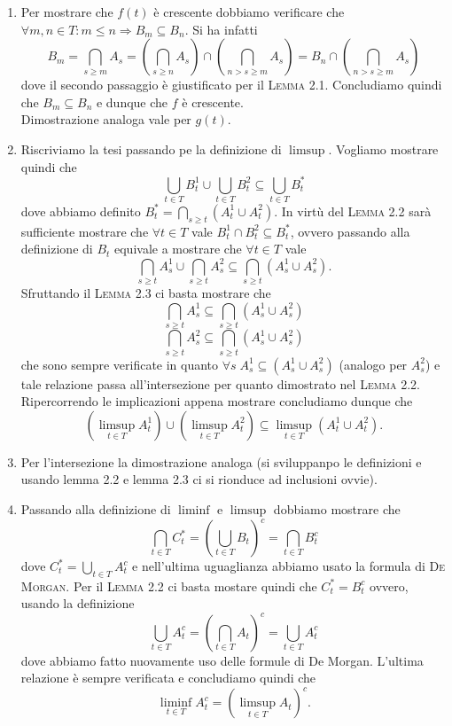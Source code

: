 \documentclass[a4paper]{article}\par \usepackage{style}\par
\begin{document}
\begin{enumerate}
\item Per mostrare che $ f(t) $ è crescente dobbiamo verificare che $ \forall m, n \in T : m \leq n \Rightarrow B_m \subseteq B_n $. Si ha infatti \[B_m = \bigcap_{s \geq m} A_s = \left( \bigcap_{s \geq n} A_s \right ) \cap \left( \bigcap_{n > s \geq m} A_s \right ) = B_n \cap \left( \bigcap_{n > s \geq m} A_s \right ) \] dove il secondo passaggio è giustificato per il \textsc{Lemma 2.1}. Concludiamo quindi che $ B_m \subseteq B_n $ e dunque che $ f $ è crescente. \\
  Dimostrazione analoga vale per $ g(t) $.
\item Riscriviamo la tesi passando pe la definizione di $ \limsup $. Vogliamo mostrare quindi che \[\bigcup_{t \in T} B_t^1 \cup \bigcup_{t \in T} B_t^2 \subseteq \bigcup_{t \in T} B_t^{*}\] dove abbiamo definito $ B_t^{*} = \bigcap_{s \geq t} (A_t^1 \cup A_t^2) $. In virtù del \textsc{Lemma 2.2} sarà sufficiente mostrare che $ \forall t \in T $ vale $ B_t^1 \cap B_t^2 \subseteq B_t^{*} $, ovvero passando alla definizione di $ B_t $ equivale a mostrare che $ \forall t \in T $ vale \[\bigcap_{s \geq t} A_s^1 \cup \bigcap_{s \geq t} A_s^2 \subseteq \bigcap_{s \geq t} (A_s^1 \cup A_s^2).\] Sfruttando il \textsc{Lemma 2.3} ci basta mostrare che \[\bigcap_{s \geq t} A_s^1 \subseteq \bigcap_{s \geq t} (A_s^1 \cup A_s^2)\] \[\bigcap_{s \geq t} A_s^2 \subseteq \bigcap_{s \geq t} (A_s^1 \cup A_s^2)\] che sono sempre verificate in quanto $ \forall s \; A_s^1 \subseteq (A_s^1 \cup A_s^2) $ (analogo per $ A_s^2 $) e tale relazione passa all'intersezione per quanto dimostrato nel \textsc{Lemma 2.2}. Ripercorrendo le implicazioni appena mostrare concludiamo dunque che \[(\limsup_{t \in T} A_t^1) \cup (\limsup_{t \in T}A_t^2) \subseteq \limsup_{t \in T} (A_t^1 \cup A_t^2).\]
\item Per l'intersezione la dimostrazione analoga (\textsf{si sviluppanpo le definizioni e usando lemma 2.2 e lemma 2.3 ci si rionduce ad inclusioni ovvie}).
\item Passando alla definizione di $ \liminf $ e $ \limsup $ dobbiamo mostrare che \[\bigcap_{t \in T} C_t^{*} = \left (\bigcup_{t \in T} B_t \right )^c = \bigcap_{t \in T} B_t^{c}\] dove $ C_t^{*} = \bigcup_{t \in T} A_t^c $ e nell'ultima uguaglianza abbiamo usato la formula di \textsc{De Morgan}. Per il \textsc{Lemma 2.2} ci basta mostare quindi che $ C_t^{*} = B_t^c $ ovvero, usando la definizione \[\bigcup_{t \in T} A_t^c = \left (\bigcap_{t \in T} A_t \right )^c = \bigcup_{t \in T} A_t^{c}\] dove abbiamo fatto nuovamente uso delle formule di De Morgan. L'ultima relazione è sempre verificata e concludiamo quindi che \[\liminf_{t \in T} A_t^c = (\limsup_{t \in T} A_t)^c.\]

\end{enumerate}
\end{document}
